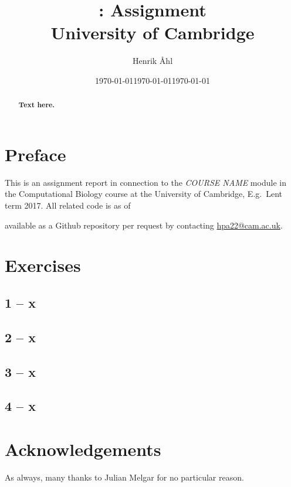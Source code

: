 \documentclass[10pt, twocolumn]{article}
\title
{\bf
  \course: Assignment \ass\\[1em]
  \small{University of Cambridge}
}
\author{Henrik Åhl}
\date{\today}
\theoremstyle{plain}
\newcommand{\course}{COURSE NAME}
\newcommand{\term}{E.g.\ Lent term 2017}
\begin{document}
\date{\today}
\maketitle
\setcounter{page}{1}
\begin{abstract}
{\bf 
  Text here.
}
\end{abstract}
\section*{Preface}
This is an assignment report in connection to the \textit{\course}
module in the Computational Biology course at the University of Cambridge,
\term. All related code is as of \date{\today} available as a
Github repository per request by contacting \href{mailto:hpa22@cam.ac.uk}{hpa22@cam.ac.uk}.

\section*{Exercises}
\subsection*{1 -- x}
\subsection*{2 -- x}
\subsection*{3 -- x}
\subsection*{4 -- x}


\section*{Acknowledgements}
As always, many thanks to Julian Melgar for no particular reason. 

\end{document}
